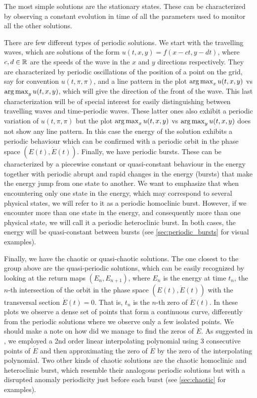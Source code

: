 \documentclass[twoside]{article}
\begin{document}
The most simple solutions are the stationary states. These can be characterized by observing a constant evolution in time of all the parameters used to monitor all the other solutions.

There are few different types of periodic solutions. We start with the travelling waves, which are solutions of the form $u(t,x,y) = f(x-ct,y-dt)$, where $c,d\in\mathbb{R}$ are the speeds of the wave in the $x$ and $y$ directions respectively. They are characterized by periodic oscillations of the position of a point on the grid, say for convention $u(t,\pi,\pi)$, and a line pattern in the plot $\operatorname*{arg\,max}_x u(t,x,y)$ vs $\operatorname*{arg\,max}_y u(t,x,y)$, which will give the direction of the front of the wave. This last characterization will be of special interest for easily distinguishing between travelling waves and time-periodic waves. These latter ones also exhibit a periodic variation of $u(t,\pi,\pi)$ but the plot $\operatorname*{arg\,max}_x u(t,x,y)$ vs $\operatorname*{arg\,max}_y u(t,x,y)$ does not show any line pattern. In this case the energy of the solution exhibits a periodic behaviour which can be confirmed with a periodic orbit in the phase space $(E(t), \dot{E}(t))$. Finally, we have periodic bursts. These can be characterized by a piecewise constant or quasi-constant behaviour in the energy together with periodic abrupt and rapid changes in the energy (bursts) that make the energy jump from one state to another. We want to emphasize that when encountering only one state in the energy, which may correspond to several physical states, we will refer to it as a periodic homoclinic burst. However, if we encounter more than one state in the energy, and consequently more than one physical state, we will call it a periodic heteroclinic burst. In both cases, the energy will be quasi-constant between bursts (see \cref{sec:periodic_bursts} for visual examples).

Finally, we have the chaotic or quasi-chaotic solutions. The one closest to the group above are the quasi-periodic solutions, which can be easily recognized by looking at the return maps $(E_n,E_{n+1})$, where $E_n$ is the energy at time $t_n$, the $n$-th intersection of the orbit in the phase space $(E(t), \dot{E}(t))$ with the transversal section $\dot{E}(t)=0$. That is, $t_n$ is the $n$-th zero of $\dot{E}(t)$. In these plots we observe a dense set of points that form a continuous curve, differently from the periodic solutions where we observe only a few isolated points. We should make a note on how did we manage to find the zeros of $\dot{E}$. As suggested in \cite{Kalogirou2015}, we employed a 2nd order linear interpolating polynomial using 3 consecutive points of $\dot{E}$ and then approximating the zero of $\dot{E}$ by the zero of the interpolating polynomial. Two other kinds of chaotic solutions are the chaotic homoclinic and heteroclinic burst, which resemble their analogous periodic solutions but with a disrupted anomaly periodicity just before each burst (see \cref{sec:chaotic} for examples).
\end{document}
